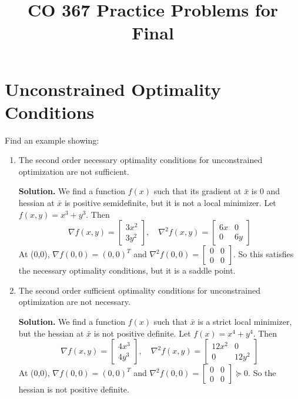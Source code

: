 \documentclass{article}
\title{CO 367 Practice Problems for Final}
\begin{document}
\maketitle
\section{Unconstrained Optimality Conditions}
Find an example showing:
\begin{enumerate}
    \item The second order necessary optimality conditions for unconstrained optimization are not sufficient.
    
    \textbf{Solution.} We find a function $f(x)$ such that its gradient at $\bar x$ is 0 and hessian at $\bar x$ is positive semidefinite, but it is not a local minimizer. Let $f(x,y) = x^3 + y^3$. Then $$\nabla f(x,y) = \begin{bmatrix} 3x^2 \\ 3y^2 \end{bmatrix}, \quad \nabla^2 f(x,y) = \begin{bmatrix} 6x & 0 \\ 0 & 6y \end{bmatrix}$$ At (0,0), $\nabla f(0,0) = (0,0)^T$ and $\nabla^2 f(0,0) = \begin{bmatrix} 0 & 0 \\ 0 & 0 \end{bmatrix}$. So this satisfies the necessary optimality conditions, but it is a saddle point.
    \item The second order sufficient optimality conditions for unconstrained optimization are not necessary.
    
    \textbf{Solution.} We find a function $f(x)$ such that $\bar x$ is a strict local minimizer, but the hessian at $\bar x$ is not positive definite. Let $f(x) = x^4 + y^4$. Then $$\nabla f(x,y) = \begin{bmatrix} 4x^3 \\ 4y^3 \end{bmatrix}, \quad \nabla^2 f(x,y) = \begin{bmatrix} 12x^2 & 0 \\ 0 & 12y^2 \end{bmatrix}$$ At (0,0), $\nabla f(0,0) = (0,0)^T$ and $\nabla^2 f(0,0) = \begin{bmatrix} 0 & 0 \\ 0 & 0 \end{bmatrix} \succeq 0$. So the hessian is not positive definite.  
\end{enumerate}
\end{document}
